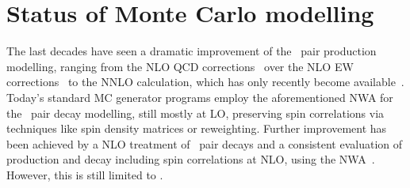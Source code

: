 \section{Status of Monte Carlo modelling}
%
The last decades have seen a dramatic improvement of the \tquark\ pair production modelling, ranging from the \gls{NLO} \gls{QCD} corrections~\cite{Nason:1987xz,Beenakker:1990maa,Frixione:1995fj} over the \gls{NLO} \gls{EW} corrections~\cite{Beenakker:1993yr} to the \gls{NNLO} calculation, which has only recently become available~\cite{Czakon:2013goa,Top2015NNLOtopxsec}.
%
Today's standard \gls{MC} generator programs employ the aforementioned \gls{NWA} for the \tquark\ pair decay modelling, still mostly at \gls{LO}, preserving spin correlations via techniques like spin density matrices or reweighting. 
%
Further improvement has been achieved by a \gls{NLO} treatment of \tquark\ pair decays and a consistent evaluation of production and decay including spin correlations at \gls{NLO}, using the \gls{NWA}~\cite{Melnikov:2009dn,Biswas:2010sa,Melnikov:2011ai}. However, this is still limited to \genlevel. 



